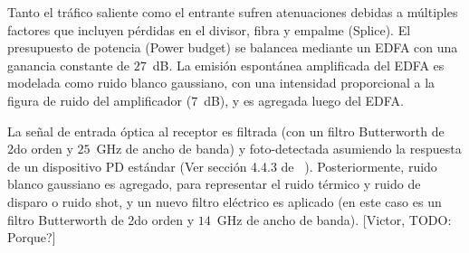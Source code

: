 Tanto el tráfico saliente como el entrante sufren atenuaciones debidas a múltiples factores que incluyen pérdidas en el divisor, fibra y empalme (Splice). El presupuesto de potencia (Power budget) se balancea mediante un EDFA con una ganancia constante de $27$~dB. La emisión espontánea amplificada del EDFA es modelada como ruido blanco gaussiano, con una intensidad proporcional a la figura de ruido del amplificador ($7$~dB), y es agregada luego del EDFA.



La señal de entrada óptica al receptor es filtrada (con un filtro Butterworth de 2do orden y $25$~GHz de ancho de banda) y foto-detectada asumiendo la respuesta de un dispositivo PD estándar (Ver sección 4.4.3 de ~\cite{Agrawal:xx}).
Posteriormente, ruido blanco gaussiano es agregado, para representar el ruido térmico y ruido de disparo o ruido shot, y un nuevo filtro eléctrico es aplicado (en este caso es un filtro Butterworth de 2do orden y $14$~GHz de ancho de banda). [Victor, TODO: Porque?]



